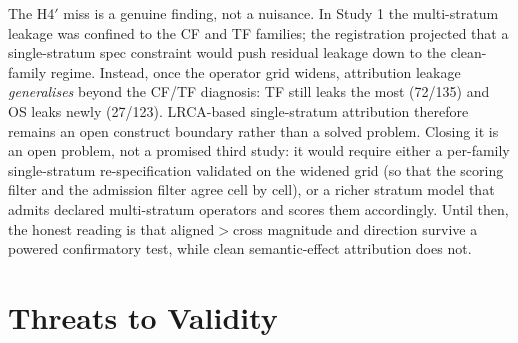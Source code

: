 \documentclass[manuscript,screen,review]{acmart}
\begin{document}
The H4\('\) miss is a genuine finding, not a nuisance. In Study 1 the
multi-stratum leakage was confined to the CF and TF families; the
registration projected that a single-stratum spec constraint would push
residual leakage down to the clean-family regime. Instead, once the
operator grid widens, attribution leakage \emph{generalises} beyond the
CF/TF diagnosis: TF still leaks the most (72/135) and OS leaks newly
(27/123). LRCA-based single-stratum attribution therefore remains an
open construct boundary rather than a solved problem. Closing it is an
open problem, not a promised third study: it would require either a
per-family single-stratum re-specification validated on the widened grid
(so that the scoring filter and the admission filter agree cell by cell),
or a richer stratum model that admits declared multi-stratum operators
and scores them accordingly. Until then, the honest reading is that
aligned\(>\)cross magnitude and direction survive a powered confirmatory
test, while clean semantic-effect attribution does not.

\section{Threats to Validity}\label{threats-to-validity}
\end{document}
